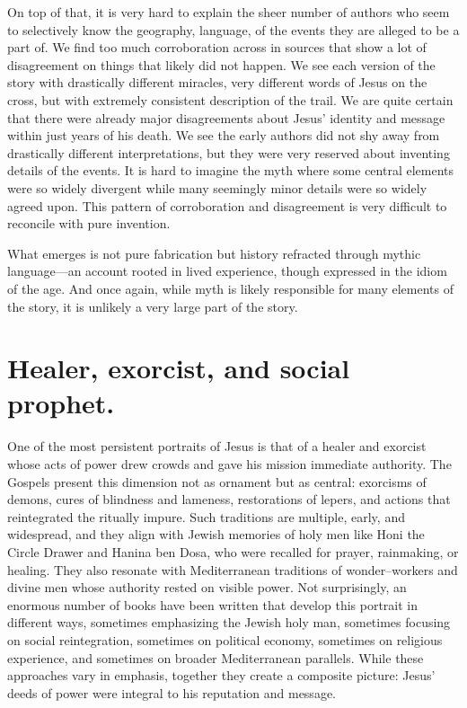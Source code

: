 On top of that, it is very hard to explain the sheer number of authors who seem to selectively know the geography, language, of the events they are alleged to be a part of.
We find too much corroboration across in sources that show a lot of disagreement on things that likely did not happen.
We see each version of the story with drastically different miracles, very different words of Jesus on the cross, but with extremely consistent description of the trail.
We are quite certain that there were already major disagreements about Jesus’ identity and message within just years of his death.
We see the early authors did not shy away from drastically different interpretations, but they were very reserved about inventing details of the events.
It is hard to imagine the myth where some central elements were so widely divergent while many seemingly minor details were so widely agreed upon.
This pattern of corroboration and disagreement is very difficult to reconcile with pure invention.

What emerges is not pure fabrication but history refracted through mythic language—an account rooted in lived experience, though expressed in the idiom of the age.
And once again, while myth is likely responsible for many elements of the story, it is unlikely a very large part of the story.

\section{Healer, exorcist, and social prophet.}\label{sec:healer}

One of the most persistent portraits of Jesus is that of a healer and exorcist whose acts of power drew crowds and gave his mission immediate authority.
The Gospels present this dimension not as ornament but as central: exorcisms of demons, cures of blindness and lameness, restorations of lepers, and actions that reintegrated the ritually impure.
Such traditions are multiple, early, and widespread, and they align with Jewish memories of holy men like Honi the Circle Drawer and Hanina ben Dosa, who were recalled for prayer, rainmaking, or healing.
They also resonate with Mediterranean traditions of wonder–workers and divine men whose authority rested on visible power.
Not surprisingly, an enormous number of books have been written that develop this portrait in different ways, sometimes emphasizing the Jewish holy man, sometimes focusing on social reintegration, sometimes on political economy, sometimes on religious experience, and sometimes on broader Mediterranean parallels.
While these approaches vary in emphasis, together they create a composite picture: Jesus’ deeds of power were integral to his reputation and message.


